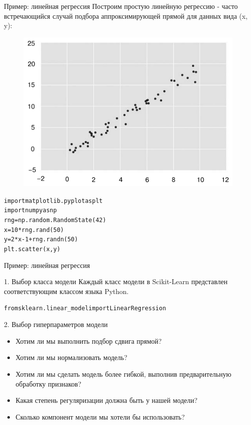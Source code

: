 \documentclass{beamer}
\begin{document}
\begin{frame}[fragile]{Пример: линейная регрессия}
Построим простую линейную регрессию - часто встречающийся случай подбора аппроксимирующей прямой для данных вида (x, y):
\begin{figure}[h]
\centering
\includegraphics[scale=0.3]{images/ex-01-01.png}
\end{figure}
\begin{alltt}
import matplotlib.pyplot as plt
import numpy as np
rng = np.random.RandomState(42)
x = 10 * rng.rand(50)
y = 2 * x - 1 + rng.randn(50)
plt.scatter(x, y)
\end{alltt}
\end{frame}

\begin{frame}[fragile]{Пример: линейная регрессия}
\begin{block}{1. Выбор класса модели}
Каждый класс модели в Scikit-Learn представлен соответствующим классом языка Python. 
\begin{alltt}
from sklearn.linear_model import LinearRegression
\end{alltt}
\end{block}
\begin{block}{2. Выбор гиперпараметров модели}
\begin{itemize}
\item Хотим ли мы выполнить подбор сдвига прямой?
\item Хотим ли мы нормализовать модель?
\item Хотим ли мы сделать модель более гибкой, выполнив предварительную обработку признаков?
\item Какая степень регуляризации должна быть у нашей модели?
\item Сколько компонент модели мы хотели бы использовать?
\end{itemize}
\end{block}
\end{frame}
\end{document}
